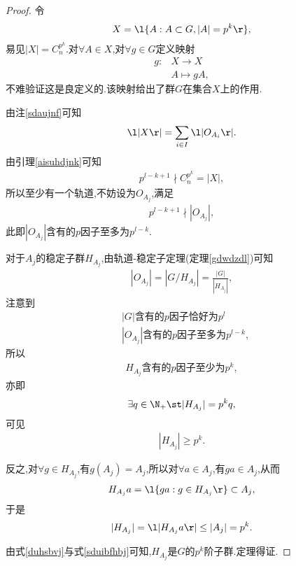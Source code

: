 \begin{proof}
    令\begin{align*}
        X=\l\{A:A\subset G,|A|=p^k\r\},
    \end{align*}易见$|X|=C_{n}^{p^k}$.对$\forall A\in X$,对$\forall g\in G$定义映射\begin{align*}
        g:&X\to X\\
        &A\mapsto gA,
    \end{align*}不难验证这是良定义的.该映射给出了群$G$在集合$X$上的作用.

    由注\ref{sdaujnf}可知\begin{align*}
        \l|X\r|=\sum_{i\in I}\l|O_{A_i}\r|.
    \end{align*}由引理\ref{aisuhdjnk}可知\begin{align*}
        p^{l-k+1}\nmid C_n^{p^k}=|X|,
    \end{align*}所以至少有一个轨道,不妨设为$O_{A_j}$,满足\begin{align*}
        p^{l-k+1}\nmid|O_{A_j}|,
    \end{align*}此即$|O_{A_j}|$含有的$p$因子至多为$p^{l-k}$.
    
    对于$A_j$的稳定子群$H_{A_j}$,由轨道-稳定子定理(定理\ref{gdwdzdl})可知\begin{align*}
        |O_{A_j}|=|G/H_{A_j}|=\frac{|G|}{|H_{A_j}|},
    \end{align*}注意到\begin{align*}
        &\text{$|G|$含有的$p$因子恰好为$p^l$}\\
        &\text{$|O_{A_j}|$含有的$p$因子至多为$p^{l-k}$},
    \end{align*}所以\begin{align*}
        \text{$H_{A_j}$含有的$p$因子至少为$p^k$},
    \end{align*}亦即\begin{align*}
        \exists q\in\N_+\st|H_{A_j}|=p^kq,
    \end{align*}可见\begin{align}\label{duhsbvj}
        |H_{A_j}|\geq p^k.
    \end{align}

    反之,对$\forall g\in H_{A_j}$,有$g(A_j)=A_j$,所以对$\forall a\in A_j$,有$ga\in A_j$,从而\begin{align*}
        H_{A_j}a=\l\{ga:g\in H_{A_j}\r\}\subset A_j,
    \end{align*}于是\begin{align}\label{sduibfhbj}
        |H_{A_j}|=\l|H_{A_j}a\r|\leq|A_j|=p^k.
    \end{align}

    由式\eqref{duhsbvj}与式\eqref{sduibfhbj}可知,$H_{A_j}$是$G$的$p^k$阶子群.定理得证.
\end{proof}

